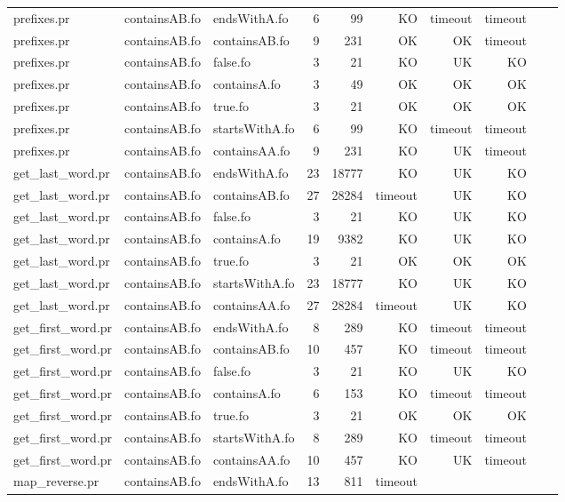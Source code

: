 \begin{tabular}{l|l|l|r|r|r|r|r|r|r}
prefixes.pr & containsAB.fo & endsWithA.fo & 6 & 99 & KO & 
timeout & timeout \\
prefixes.pr & containsAB.fo & containsAB.fo & 9 & 231 & OK & 
OK & timeout \\
prefixes.pr & containsAB.fo & false.fo & 3 & 21 & KO & 
UK & KO \\
prefixes.pr & containsAB.fo & containsA.fo & 3 & 49 & OK & 
OK & OK \\
prefixes.pr & containsAB.fo & true.fo & 3 & 21 & OK & 
OK & OK \\
prefixes.pr & containsAB.fo & startsWithA.fo & 6 & 99 & KO & 
timeout & timeout \\
prefixes.pr & containsAB.fo & containsAA.fo & 9 & 231 & KO & 
UK & timeout \\
get\_last\_word.pr & containsAB.fo & endsWithA.fo & 23 & 18777 & KO & 
UK & KO \\
get\_last\_word.pr & containsAB.fo & containsAB.fo & 27 & 28284 & timeout & 
UK & KO \\
get\_last\_word.pr & containsAB.fo & false.fo & 3 & 21 & KO & 
UK & KO \\
get\_last\_word.pr & containsAB.fo & containsA.fo & 19 & 9382 & KO & 
UK & KO \\
get\_last\_word.pr & containsAB.fo & true.fo & 3 & 21 & OK & 
OK & OK \\
get\_last\_word.pr & containsAB.fo & startsWithA.fo & 23 & 18777 & KO & 
UK & KO \\
get\_last\_word.pr & containsAB.fo & containsAA.fo & 27 & 28284 & timeout & 
UK & KO \\
get\_first\_word.pr & containsAB.fo & endsWithA.fo & 8 & 289 & KO & 
timeout & timeout \\
get\_first\_word.pr & containsAB.fo & containsAB.fo & 10 & 457 & KO & 
timeout & timeout \\
get\_first\_word.pr & containsAB.fo & false.fo & 3 & 21 & KO & 
UK & KO \\
get\_first\_word.pr & containsAB.fo & containsA.fo & 6 & 153 & KO & 
timeout & timeout \\
get\_first\_word.pr & containsAB.fo & true.fo & 3 & 21 & OK & 
OK & OK \\
get\_first\_word.pr & containsAB.fo & startsWithA.fo & 8 & 289 & KO & 
timeout & timeout \\
get\_first\_word.pr & containsAB.fo & containsAA.fo & 10 & 457 & KO & 
UK & timeout \\
map\_reverse.pr & containsAB.fo & endsWithA.fo & 13 & 811 & timeout & 

\end{tabular}
